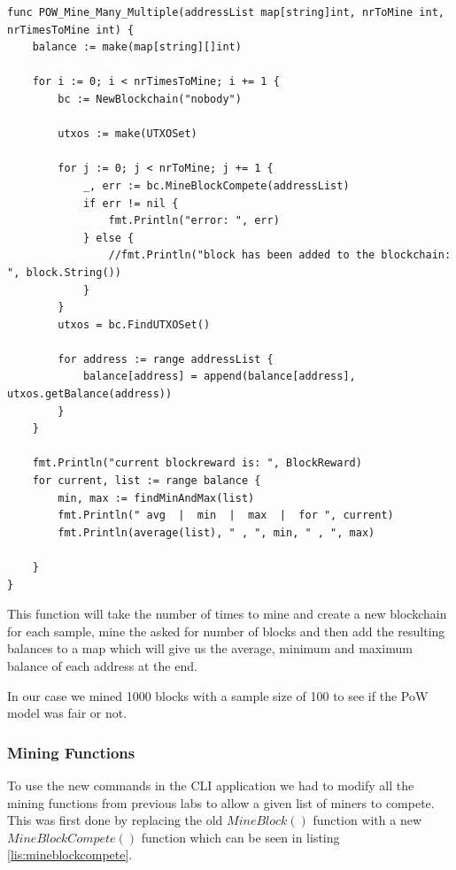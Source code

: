 \documentclass{article}
\begin{document}
\begin{lstlisting}[language=Golang, caption=POW\_Mine\_Many\_Multiple, label={lis:manymanymultiple}]
func POW_Mine_Many_Multiple(addressList map[string]int, nrToMine int, nrTimesToMine int) {
	balance := make(map[string][]int)

	for i := 0; i < nrTimesToMine; i += 1 {
		bc := NewBlockchain("nobody")

		utxos := make(UTXOSet)

		for j := 0; j < nrToMine; j += 1 {
			_, err := bc.MineBlockCompete(addressList)
			if err != nil {
				fmt.Println("error: ", err)
			} else {
				//fmt.Println("block has been added to the blockchain: ", block.String())
			}
		}
		utxos = bc.FindUTXOSet()

		for address := range addressList {
			balance[address] = append(balance[address], utxos.getBalance(address))
		}
	}

	fmt.Println("current blockreward is: ", BlockReward)
	for current, list := range balance {
		min, max := findMinAndMax(list)
		fmt.Println(" avg  |  min  |  max  |  for ", current)
		fmt.Println(average(list), " , ", min, " , ", max)

	}
}
\end{lstlisting}

This function will take the number of times to mine and create a new blockchain for each sample, mine the asked for number of blocks and then add the resulting balances to a map which will give us the average, minimum and maximum balance of each address at the end.

In our case we mined 1000 blocks with a sample size of 100 to see if the \gls{PoW} model was fair or not. 

\subsubsection{Mining Functions}
To use the new commands in the CLI application we had to modify all the mining functions from previous labs to allow a given list of miners to compete. This was first done by replacing the old $MineBlock()$ function with a new $MineBlockCompete()$ function which can be seen in listing \ref{lis:mineblockcompete}.
\end{document}
